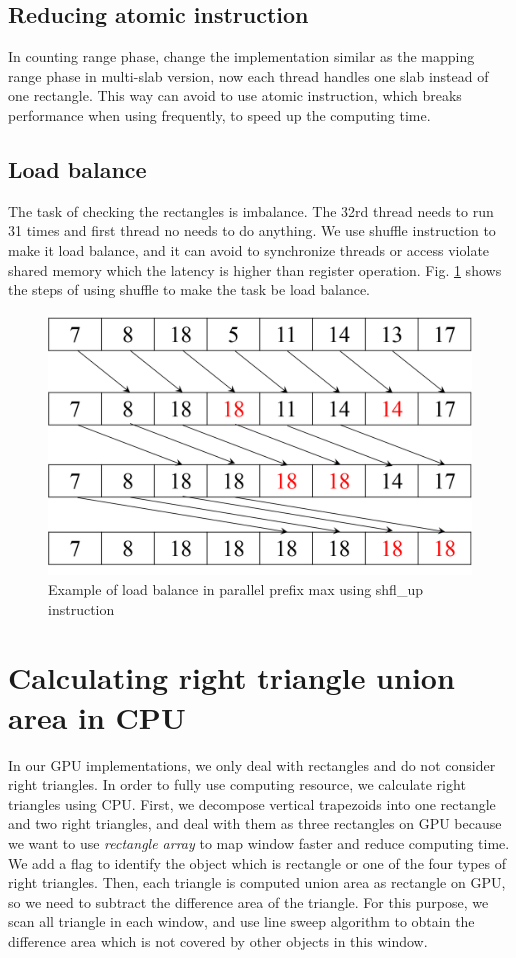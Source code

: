 \subsection{Reducing atomic instruction}
In counting range phase, change the implementation similar as the mapping range phase in multi-slab version, now each thread handles one slab instead of one rectangle. This way can avoid to use atomic instruction, which breaks performance when using frequently, to speed up the computing time.

\subsection{Load balance}
The task of checking the rectangles is imbalance. The 32rd thread needs to run 31 times and first thread no needs to do anything. We use shuffle instruction to make it load balance, and it can avoid to synchronize threads or access violate shared memory which the latency is higher than register operation. Fig. \ref{fig:fig_4_3} shows the steps of using shuffle to make the task be load balance.
\begin{figure}[h]
    \centering
    \includegraphics[scale=0.4]{image/fig_4_3.png}
    \caption{Example of load balance in parallel prefix max using shfl\_up instruction }
    \label{fig:fig_4_3}
\end{figure}

\section{Calculating right triangle union area in CPU}
In our GPU implementations, we only deal with rectangles and do not consider right triangles. In order to fully use computing resource, we calculate right triangles using CPU. First, we decompose vertical trapezoids into one rectangle and two right triangles, and deal with them as three rectangles on GPU because we want to use \textit{rectangle array} to map window faster and reduce computing time. We add a flag to identify the object which is rectangle or one of the four types of right triangles. Then, each triangle is computed union area as rectangle on GPU, so we need to subtract the difference area of the triangle. For this purpose, we scan all triangle in each window, and use line sweep algorithm to obtain the difference area which is not covered by other objects in this window.

